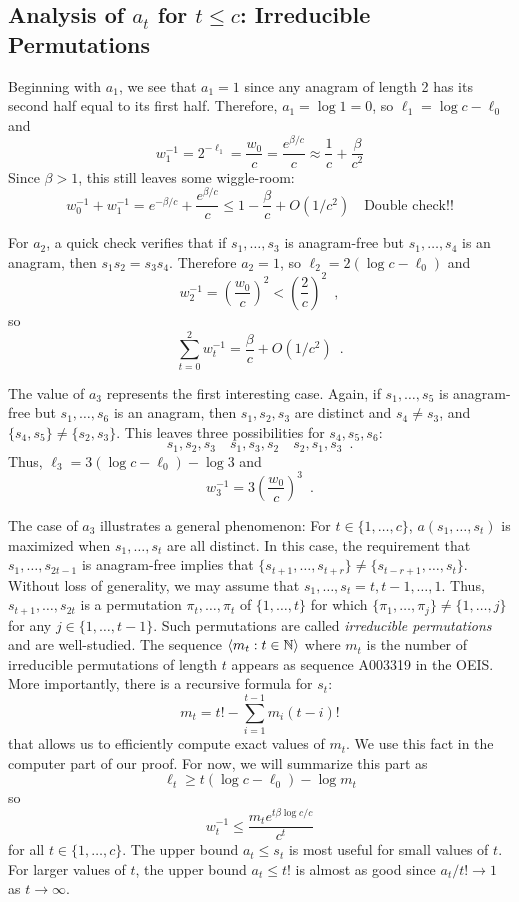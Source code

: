 \documentclass{patmorin}
\begin{document}
\subsection{Analysis of $a_t$ for $t\le c$: Irreducible Permutations}

Beginning with $a_1$, we see that $a_1=1$ since any anagram of length 2 has its second half equal to its first half.  Therefore, $a_1=\log 1 = 0$, so $\ell_1=\log c - \ell_0$ and 
\[
   w_1^{-1} = 2^{-\ell_1} = \frac{w_0}{c} = \frac{e^{\beta/c}}{c} \approx \frac{1}{c}+\frac{\beta}{c^2}
\]
Since $\beta >1$, this still leaves some wiggle-room:
\[
    w_0^{-1} + w_1^{-1} = e^{-\beta/c} + \frac{e^{\beta/c}}{c}
    \le 1 - \frac{\beta}{c} + O(1/c^2)  \quad \text{Double check!!}
\]

For $a_2$, a quick check verifies that if $s_1,\ldots,s_3$ is anagram-free but $s_1,\ldots,s_4$ is an anagram, then $s_1s_2=s_3s_4$.  Therefore $a_2=1$, so
$\ell_2 = 2(\log c - \ell_0)$ and
\[
   w_2^{-1} = \left(\frac{w_0}{c}\right)^2 < \left(\frac{2}{c}\right)^2 \enspace , 
\]
so 
\[
  \sum_{t=0}^2 w_t^{-1} = \frac{\beta}{c} + O(1/c^2) \enspace .
\]

The value of $a_3$ represents the first interesting case.  Again, if $s_1,\ldots,s_5$ is anagram-free but $s_1,\ldots,s_6$ is an anagram, then $s_1,s_2,s_3$ are distinct and $s_4\neq s_3$, and $\{s_4,s_5\}\neq \{s_2,s_3\}$.  This leaves three possibilities for $s_4,s_5,s_6$:
\[   s_1,s_2,s_3 \quad s_1,s_3,s_2 \quad s_2,s_1,s_3 \enspace . \]
Thus, $\ell_3 = 3(\log c - \ell_0) - \log 3$ and
\[
   w_3^{-1} = 3\left(\frac{w_0}{c}\right)^{3} \enspace .
\]

The case of $a_3$ illustrates a general phenomenon: For $t\in\{1,\ldots,c\}$, $a(s_1,\ldots,s_t)$ is maximized when $s_1,\ldots,s_t$ are all distinct.  In this case, the requirement that $s_1,\ldots,s_{2t-1}$ is anagram-free implies that $\{s_{t+1},\ldots,s_{t+r}\}\neq\{s_{t-r+1},\ldots,s_t\}$.  Without loss of generality, we may assume that $s_1,\ldots,s_t=t,t-1,\ldots,1$.  Thus, $s_{t+1},\ldots,s_{2t}$ is a permutation $\pi_t,\ldots,\pi_t$ of $\{1,\ldots,t\}$ for which $\{\pi_1,\ldots,\pi_j\}\neq\{1,\ldots,j\}$ for any $j\in\{1,\ldots,t-1\}$.  Such permutations are called \emph{irreducible permutations} and are well-studied.  The sequence $\langle m_t: t\in\mathbb{N}\rangle$ where $m_t$ is the number of irreducible permutations of length $t$ appears as sequence A003319 in the OEIS.  More importantly, there is a recursive formula for $s_t$:
\[
   m_t = t! - \sum_{i=1}^{t-1} m_i(t-i)!
\]
that allows us to efficiently compute exact values of $m_t$. We use this fact in the computer part of our proof.  For now, we will summarize this part as
\[
    \ell_t \ge t(\log c-\ell_0) - \log m_t
\]
so
\[
   w_t^{-1} \le \frac{m_t e^{t\beta\log c/c}}{c^t}
\]
for all $t\in\{1,\ldots,c\}$.  The upper bound $a_t \le s_t$ is most useful for small values of $t$.  For larger values of $t$, the upper bound $a_t \le t!$ is almost as good since $a_t/t!\rightarrow 1$ as $t\rightarrow\infty$.
\end{document}
